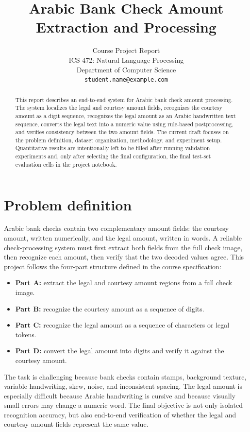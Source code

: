 \documentclass{article}
\title{Arabic Bank Check Amount Extraction and Processing}
\author{%
  Course Project Report\\
  ICS 472: Natural Language Processing\\
  Department of Computer Science\\
  \texttt{student.name@example.com}
}
\begin{document}
\maketitle

\begin{abstract}
This report describes an end-to-end system for Arabic bank check amount processing. The system localizes the legal and courtesy amount fields, recognizes the courtesy amount as a digit sequence, recognizes the legal amount as an Arabic handwritten text sequence, converts the legal text into a numeric value using rule-based postprocessing, and verifies consistency between the two amount fields. The current draft focuses on the problem definition, dataset organization, methodology, and experiment setup. Quantitative results are intentionally left to be filled after running validation experiments and, only after selecting the final configuration, the final test-set evaluation cells in the project notebook.
\end{abstract}

\section{Problem definition}

Arabic bank checks contain two complementary amount fields: the courtesy amount, written numerically, and the legal amount, written in words. A reliable check-processing system must first extract both fields from the full check image, then recognize each amount, then verify that the two decoded values agree. This project follows the four-part structure defined in the course specification:

\begin{itemize}
  \item \textbf{Part A:} extract the legal and courtesy amount regions from a full check image.
  \item \textbf{Part B:} recognize the courtesy amount as a sequence of digits.
  \item \textbf{Part C:} recognize the legal amount as a sequence of characters or legal tokens.
  \item \textbf{Part D:} convert the legal amount into digits and verify it against the courtesy amount.
\end{itemize}

The task is challenging because bank checks contain stamps, background texture, variable handwriting, skew, noise, and inconsistent spacing. The legal amount is especially difficult because Arabic handwriting is cursive and because visually small errors may change a numeric word. The final objective is not only isolated recognition accuracy, but also end-to-end verification of whether the legal and courtesy amount fields represent the same value.
\end{document}
